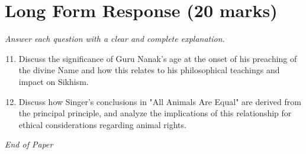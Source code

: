 \documentclass[12pt]{article}
\begin{document}
\section*{Long Form Response (20 marks)}
\textit{Answer each question with a clear and complete explanation.}
\begin{enumerate}[label=\arabic*.]
\setcounter{enumi}{10}
\item Discuss the significance of Guru Nanak's age at the onset of his preaching of the divine Name and how this relates to his philosophical teachings and impact on Sikhism.
\item Discuss how Singer's conclusions in "All Animals Are Equal" are derived from the principal principle, and analyze the implications of this relationship for ethical considerations regarding animal rights.
\end{enumerate}

\vfill
\noindent\textit{End of Paper}
\end{document}
